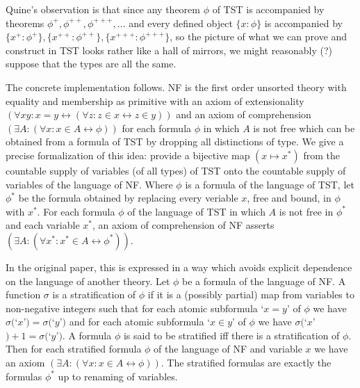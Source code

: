 \documentclass[112pt]{article}
\begin{document}
Quine's observation is that since any theorem $\phi$ of TST is accompanied by theorems $\phi^+, \phi^{++}, \phi^{+++}, \ldots$ and every defined object $\{x:\phi\}$ is accompanied by
$\{x^+:\phi^+\},\{x^{++}:\phi^{++}\},\{x^{+++}:\phi^{+++}\}$, so the picture of what we can prove and construct in TST looks rather like a hall of mirrors, we might reasonably (?) suppose that the types are all the same.

The concrete implementation follows.  NF is the first order unsorted theory with equality and membership as primitive with an axiom of extensionality $(\forall xy:x=y \leftrightarrow (\forall z:z \in x \leftrightarrow z\in y))$ and an axiom of comprehension $(\exists A:(\forall x:x \in A \leftrightarrow \phi))$ for each formula $\phi$ in which $A$ is not free which can be obtained from a formula of TST by dropping all distinctions of type.  We give a precise formalization of this idea:  provide a bijective map $(x \mapsto x^*)$ from the countable supply of variables (of all types) of TST onto the countable supply of variables of the language of NF.  Where $\phi$ is a formula of the language of TST, let $\phi^*$ be the formula obtained by replacing every veriable $x$, free and bound,
in $\phi$ with $x^*$. For each formula $\phi$ of the language of TST in which $A$ is not free in $\phi^*$ and each variable $x^*$, an axiom of comprehension of NF asserts $(\exists A:(\forall x^*:x^* \in A \leftrightarrow \phi^*))$.

In the original paper, this is expressed in a way which avoids explicit dependence on the language of another theory.  Let $\phi$ be a formula of the language of
NF.  A function $\sigma$ is a stratification of $\phi$ if it is a (possibly partial) map from variables to non-negative integers such that for each atomic subformula
`$x=y$'  of $\phi$ we have $\sigma($`$x$'$)=\sigma($`$y$'$)$ and for each atomic subformula `$x \in y$' of $\phi$ we have $\sigma($`$x$'$)+1 = \sigma($`$y$'$)$.
A formula $\phi$ is said to be stratified iff there is a stratification of $\phi$.  Then for each stratified formula $\phi$ of the language of NF and variable $x$ we have an axiom $(\exists A:(\forall x:x \in A \leftrightarrow \phi))$.  The stratified formulas are exactly the formulas $\phi^*$ up to renaming of variables.
\end{document}
